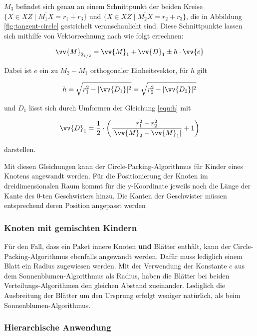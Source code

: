 $M_3$ befindet sich genau an einem Schnittpunkt der beiden Kreise $\lbrace X \in XZ \mid \overline{M_1 X} = r_1 + r_3 \rbrace$ und $\lbrace X \in XZ \mid \overline{M_2 X} = r_2 + r_3 \rbrace$, die in Abbildung \ref{fig:tangent-circle} gestrichelt veranschaulicht sind. Diese Schnittpunkte lassen sich mithilfe von Vektorrechnung nach \cite{wikipedia2017schnitt} wie folgt errechnen:

\begin{equation}
  \vv{M}_{3_{1/2}} = \vv{M}_1 + \vv{D}_{1} \pm h \cdot \vv{e}
\end{equation}

Dabei ist $e$ ein zu $M_2 - M_1$ orthogonaler Einheitsvektor, für $h$ gilt

\begin{equation}
\label{equ:h}
  h = \sqrt{r_1^2 - \vert \vv{D_1} \vert^2} = \sqrt{r_2^2 - \vert \vv{D_2} \vert^2}
\end{equation}

und $D_1$ lässt sich durch Umformen der Gleichung \ref{equ:h} mit

\begin{equation}
  \vv{D}_1 = \frac{1}{2} \cdot \left( \frac{r_1^2 - r_2^2}{\vert \vv{M}_2 - \vv{M}_1 \vert} + 1 \right)
\end{equation}

darstellen.

Mit diesen Gleichungen kann der Circle-Packing-Algorithmus für Kinder eines Knotens angewandt werden. Für die Positionierung der Knoten im dreidimensionalen Raum kommt für die y-Koordinate jeweils noch die Länge der Kante des $0$-ten Geschwisters hinzu. Die Kanten der Geschwister müssen entsprechend deren Position angepasst werden

\subsubsection*{Knoten mit gemischten Kindern}

Für den Fall, dass ein Paket innere Knoten \textbf{und} Blätter enthält, kann der Circle-Packing-Algorithmus ebenfalls angewandt werden. Dafür muss lediglich einem Blatt ein Radius zugewiesen werden. Mit der Verwendung der Konstante $c$ aus dem Sonnenblumen-Algorithmus als Radius, haben die Blätter bei beiden Verteilungs-Algorithmen den gleichen Abstand zueinander. Lediglich die Ausbreitung der Blätter um den Ursprung erfolgt weniger natürlich, als beim Sonnenblumen-Algorithmus.

\subsubsection*{Hierarchische Anwendung}

